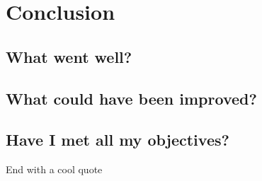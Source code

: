 \chapter{Conclusion}

\section{What went well?}

\section{What could have been improved?}

\section{Have I met all my objectives?}

End with a cool quote